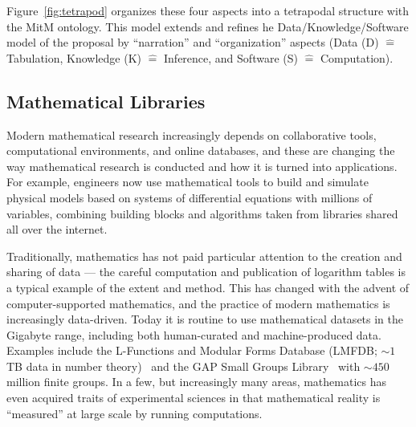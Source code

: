 \def\hateq{\ensuremath{\widehat=}\xspace}
Figure~\ref{fig:tetrapod} organizes these four aspects into a tetrapodal structure with the MitM ontology.  This model extends and refines he Data/Knowledge/Software model of the proposal by ``narration'' and ``organization'' aspects (Data (D) \hateq Tabulation, Knowledge (K) \hateq Inference, and Software (S) \hateq Computation). 

\subsection{Mathematical Libraries}\label{sec:mathlib}

Modern mathematical research increasingly depends on collaborative tools, computational environments, and online databases, and these are changing the way mathematical research is conducted and how it is turned into applications.
For example, engineers now use mathematical tools to build and simulate physical models based on systems of differential equations with millions of variables, combining building blocks and algorithms taken from libraries shared all over the internet.

Traditionally, mathematics has not paid particular attention to the creation and sharing of data --- the careful computation and publication of logarithm tables is a typical example of the extent and method.
This has changed with the advent of computer-supported mathematics, and the practice of modern mathematics is increasingly data-driven.
Today it is routine to use mathematical datasets in the Gigabyte range, including both human-curated and machine-produced data.
Examples include the L-Functions and Modular Forms Database (LMFDB; $\sim 1$ TB data in number theory)~\cite{Cremona:LMFDB16,lmfdb:on} and the GAP Small Groups Library~\cite{GapSmallGroups:on} with $\sim 450$ million finite groups.  
In a few, but increasingly many areas, mathematics has even acquired traits of experimental sciences in that mathematical reality is ``measured'' at large scale by running computations.

